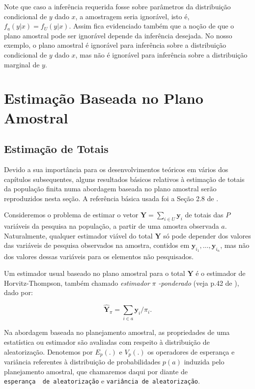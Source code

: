 \documentclass[]{book}
\numberwithin{example}{chapter}
\numberwithin{remark}{chapter}
\numberwithin{definition}{chapter}
\begin{document}
Note que caso a inferência requerida fosse sobre parâmetros da
distribuição condicional de \(y\) dado \(x\), a amostragem seria
ignorável, isto é, \(f_a ( y | x) = f_U (y | x)\). Assim fica
evidenciado também que a noção de que o plano amostral pode ser
ignorável depende da inferência desejada. No nosso exemplo, o plano
amostral é ignorável para inferência sobre a distribuição condicional de
\(y\) dado \(x\), mas não é ignorável para inferência sobre a
distribuição marginal de \(y\).

\chapter{Estimação Baseada no Plano Amostral}\label{capplanamo}

\section{Estimação de Totais}\label{estimatotais}

Devido a sua importância para os desenvolvimentos teóricos em vários dos
capítulos subsequentes, alguns resultados básicos relativos à estimação
de totais da população finita numa abordagem baseada no plano amostral
serão reproduzidos nesta seção. A referência básica usada foi a Seção
2.8 de \citep{SSW92}.

Consideremos o problema de estimar o vetor
\(\mathbf{Y}=\sum_{i \in U}\mathbf{y}_i\) de totais das \(P\) variáveis
da pesquisa na população, a partir de uma amostra observada \(a\).
Naturalmente, qualquer estimador viável do total \(\mathbf{Y}\) só pode
depender dos valores das variáveis de pesquisa observados na amostra,
contidos em \(\mathbf{y}_{i_{1}}, \ldots , \mathbf{y}_{i_{n}}\), mas não
dos valores dessas variáveis para os elementos não pesquisados.

Um estimador usual baseado no plano amostral para o total \(\mathbf{Y}\)
é o estimador de Horvitz-Thompson, também chamado \emph{estimador}
\(\pi\) \emph{-ponderado} (veja p.42 de \citep{SSW92}), dado por:

\begin{equation}
\hat{\mathbf{Y}}_\pi = \sum_{i \in a} \mathbf{y}_i / \pi_{i} . \label{eq:estpa1}
\end{equation}

Na abordagem baseada no planejamento amostral, as propriedades de uma
estatística ou estimador são avaliadas com respeito à distribuição de
aleatorização. Denotemos por \(E_p(.)\) e \(V_p(.)\) os operadores de
esperança e variância referentes à distribuição de probabilidades
\(p(a)\) induzida pelo planejamento amostral, que chamaremos daqui por
diante de \texttt{esperança\ \ de\ aleatorização} e
\texttt{variância\ de\ aleatorização}.
\end{document}
